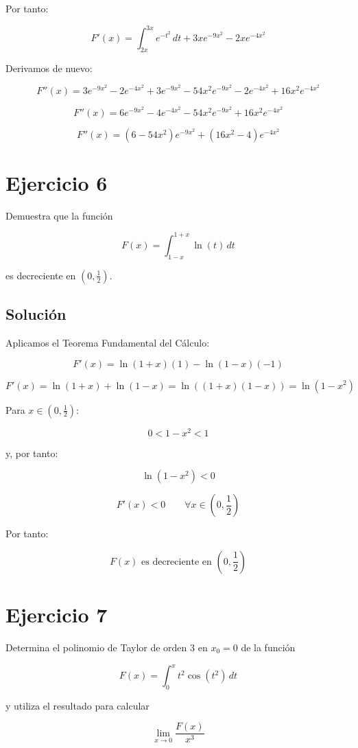 \documentclass[fleqn]{article}
\begin{document}
	Por tanto:

	\[
	\boxed{
	F'(x)
	=
	\int_{2x}^{3x}e^{-t^2}\,dt
	+
	3xe^{-9x^2}
	-
	2xe^{-4x^2}
	}
	\]

	Derivamos de nuevo:

	\[
	F''(x)
	=
	3e^{-9x^2}
	-
	2e^{-4x^2}
	+
	3e^{-9x^2}
	-
	54x^2e^{-9x^2}
	-
	2e^{-4x^2}
	+
	16x^2e^{-4x^2}
	\]

	\[
	F''(x)
	=
	6e^{-9x^2}
	-
	4e^{-4x^2}
	-
	54x^2e^{-9x^2}
	+
	16x^2e^{-4x^2}
	\]

	\[
	\boxed{
	F''(x)
	=
	(6-54x^2)e^{-9x^2}
	+
	(16x^2-4)e^{-4x^2}
	}
	\]

\section{Ejercicio 6}
	Demuestra que la función

	\[
	F(x)=\int_{1-x}^{1+x}\ln(t)\,dt
	\]

	es decreciente en $\left(0,\frac{1}{2}\right)$.

	\subsection{Solución}

	Aplicamos el Teorema Fundamental del Cálculo:

	\[
	F'(x)
	=
	\ln(1+x)(1)
	-
	\ln(1-x)(-1)
	\]

	\[
	F'(x)
	=
	\ln(1+x)+\ln(1-x)
	=
	\ln\left((1+x)(1-x)\right)
	=
	\ln(1-x^2)
	\]

	Para $x\in\left(0,\frac{1}{2}\right)$:

	\[
	0<1-x^2<1
	\]

	y, por tanto:

	\[
	\ln(1-x^2)<0
	\]

	\[
	F'(x)<0
	\qquad
	\forall x\in\left(0,\frac{1}{2}\right)
	\]

	Por tanto:

	\[
	\boxed{
	F(x)\text{ es decreciente en }
	\left(0,\frac{1}{2}\right)
	}
	\]

\section{Ejercicio 7}
	Determina el polinomio de Taylor de orden 3 en $x_0=0$ de la función

	\[
	F(x)=\int_0^x t^2\cos(t^2)\,dt
	\]

	y utiliza el resultado para calcular

	\[
	\lim_{x\to0}\frac{F(x)}{x^3}
	\]
\end{document}

